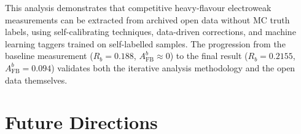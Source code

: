 \documentclass[11pt,a4paper]{article}
\begin{document}
This analysis demonstrates that competitive heavy-flavour
electroweak measurements can be extracted from archived open data
without MC truth labels, using self-calibrating techniques,
data-driven corrections, and machine learning taggers trained on
self-labelled samples.
The progression from the baseline measurement
($R_b = 0.188$, $A_\text{FB}^b \approx 0$) to the final result
($R_b = 0.2155$, $A_\text{FB}^b = 0.094$) validates both the
iterative analysis methodology and the open data themselves.

\section{Future Directions}
\label{sec:future}
\end{document}
